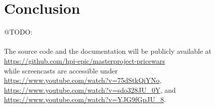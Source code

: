 \newpage 
\section{Conclusion}
\label{sec:conclusion}

@TODO:\\
\\
The source code and the documentation will be publicly available at\\
\url{https://github.com/hpi-epic/masterproject-pricewars} \\
while screencasts are accessible under\\
\sloppy
\url{https://www.youtube.com/watch?v=75dStkQiYNo},  
\url{https://www.youtube.com/watch?v=sdo328JU_0Y}, and
\url{https://www.youtube.com/watch?v=YJG9fGpJU_8}.\\